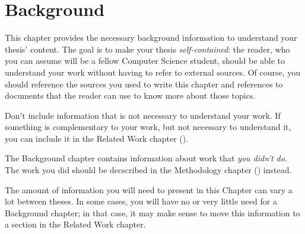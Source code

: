 \chapter{Background}
\label{sec:background}

This chapter provides the necessary background information to understand your thesis' content.
The goal is to make your thesis \emph{self-contained}: the reader, who you can assume will be
a fellow Computer Science student, should be able to understand your work without having to refer
to external sources. Of course, you should reference the sources you used to write this chapter
and references to documents that the reader can use to know more about those topics.

Don't include information that is not necessary to understand your work. If something is
complementary to your work, but not necessary to understand it, you can include it in the
Related Work chapter ().

The Background chapter contains information about work that \emph{you didn't do}. The work you
did should be decscribed in the Methodology chapter () instead.

The amount of information you will need to present in this Chapter can vary a lot between theses.
In some cases, you will have no or very little need for a Background chapter; in that case, it
may make sense to move this information to a section in the Related Work chapter.
